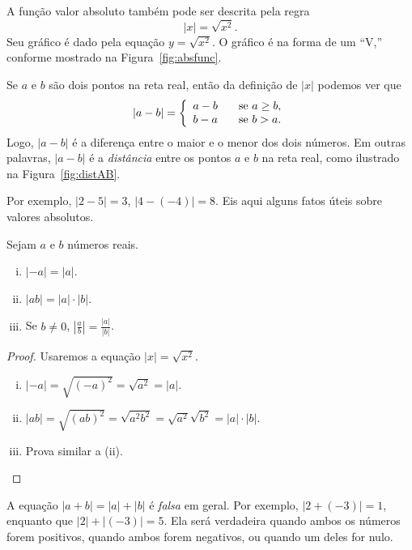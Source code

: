 A função valor absoluto também pode ser descrita pela regra
\[
  |x| = \sqrt{x^2}.
\]
Seu gráfico é dado pela equação $y = \sqrt{x^2}$. O gráfico é
na forma de um ``V,'' conforme mostrado na Figura~\ref{fig:absfunc}.


Se $a$ e $b$ são dois pontos na reta real, então da definição
de $|x|$ podemos ver que
\[
  |a - b| = \left\{
            \begin{array}{r l}
              a - b & \hspace{2ex} \text{se } a \ge b, \\
              b - a & \hspace{2ex} \text{se } b > a.
            \end{array}
            \right.
\]
Logo, $|a-b|$ é a diferença entre o maior e o menor
dos dois números. Em outras palavras, $|a-b|$ é a
\emph{distância} entre os pontos $a$ e $b$ na reta real,
como ilustrado na Figura~\ref{fig:distAB}.


Por exemplo, $|2-5| = 3$, $|4 - (-4)| = 8$. Eis aqui alguns
fatos úteis sobre valores absolutos.

\begin{theorem}
\label{theo:absvalues}
Sejam $a$ e $b$ números reais.
\begin{enumerate}[(i)]
  \item $|-a| = |a|$.
  \item $|ab| = |a|\cdot|b|$.
  \item Se $b \ne 0$, $\displaystyle\left|\frac{a}{b}\right| = \frac{|a|}{|b|}$.
\end{enumerate}
\end{theorem}

\begin{proof}
Usaremos a equação $|x| = \sqrt{x^2}$.
\begin{enumerate}[(i)]
  \item $|-a| = \sqrt{(-a)^2} = \sqrt{a^2} = |a|.$
  \item $|ab| = \sqrt{(ab)^2} = \sqrt{a^2b^ 2} = \sqrt{a^2}\sqrt{b^2}
         = |a|\cdot|b|.$
  \item Prova similar a (ii).
\end{enumerate}
\end{proof}

\begin{warning}
A equação $|a + b| = |a|+|b|$ é \emph{falsa} em geral. Por exemplo,
$|2 + (-3)| = 1$, enquanto que $|2| + |(-3)| = 5$. Ela será verdadeira
quando ambos os números forem positivos, quando ambos forem negativos,
ou quando um deles for nulo.
\end{warning}

